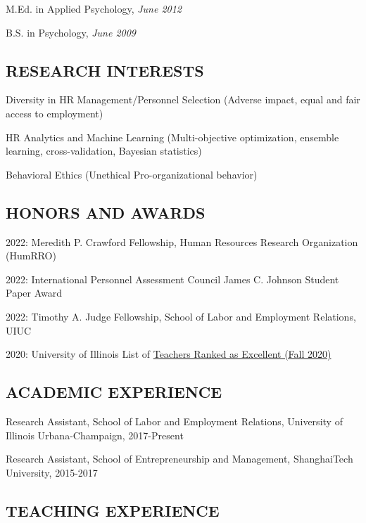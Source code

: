 \documentclass[
  20,
]{article}
\begin{document}
M.Ed. in Applied Psychology, \emph{June 2012}

B.S. in Psychology, \emph{June 2009}

\hypertarget{research-interests}{%
\subsection{\texorpdfstring{\textbf{RESEARCH
INTERESTS}}{RESEARCH INTERESTS}}\label{research-interests}}

Diversity in HR Management/Personnel Selection (Adverse impact, equal
and fair access to employment)

HR Analytics and Machine Learning (Multi-objective optimization,
ensemble learning, cross-validation, Bayesian statistics)

Behavioral Ethics (Unethical Pro-organizational behavior)

\hypertarget{honors-and-awards}{%
\subsection{\texorpdfstring{\textbf{HONORS AND
AWARDS}}{HONORS AND AWARDS}}\label{honors-and-awards}}

2022: Meredith P. Crawford Fellowship, Human Resources Research
Organization (HumRRO)

2022: International Personnel Assessment Council James C. Johnson
Student Paper Award

2022: Timothy A. Judge Fellowship, School of Labor and Employment
Relations, UIUC

2020: University of Illinois List of
\href{https://citl.illinois.edu/citl-101/measurement-evaluation/teaching-evaluation/teaching-evaluations-(ices)/teachers-ranked-as-excellent}{Teachers
Ranked as Excellent (Fall 2020)}

\hypertarget{academic-experience}{%
\subsection{\texorpdfstring{\textbf{ACADEMIC
EXPERIENCE}}{ACADEMIC EXPERIENCE}}\label{academic-experience}}

Research Assistant, School of Labor and Employment Relations, University
of Illinois Urbana-Champaign, 2017-Present

Research Assistant, School of Entrepreneurship and Management,
ShanghaiTech University, 2015-2017

\hypertarget{teaching-experience}{%
\subsection{\texorpdfstring{\textbf{TEACHING
EXPERIENCE}}{TEACHING EXPERIENCE}}\label{teaching-experience}}
\end{document}
